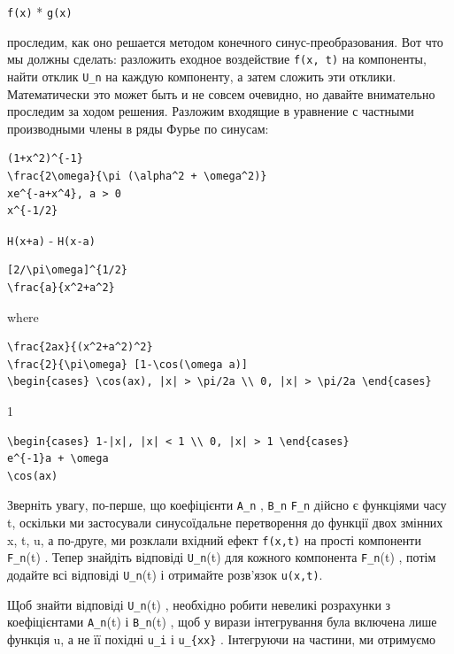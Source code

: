\documentclass[
  ukrainian,
]{article}
\begin{document}
\texttt{f(x)} * \texttt{g(x)}

проследим, как оно решается методом конечного синус-преобразования. Вот
что мы должны сделать: разложить еходное воздействие \texttt{f(x,\ t)}
на компоненты, найти отклик \texttt{U\_n} на каждую компоненту, а затем
сложить эти отклики. Математически это может быть и не совсем очевидно,
но давайте внимательно проследим за ходом решения. Разложим входящие в
уравнение с частными производными члены в ряды Фурье по синусам:

\begin{verbatim}
(1+x^2)^{-1}
\frac{2\omega}{\pi (\alpha^2 + \omega^2)}
xe^{-a+x^4}, a > 0
x^{-1/2}
\end{verbatim}

\texttt{H(x+a)} - \texttt{H(x-a)}

\begin{verbatim}
[2/\pi\omega]^{1/2}
\frac{a}{x^2+a^2}
\end{verbatim}

where

\begin{verbatim}
\frac{2ax}{(x^2+a^2)^2}
\frac{2}{\pi\omega} [1-\cos(\omega a)]
\begin{cases} \cos(ax), |x| > \pi/2a \\ 0, |x| > \pi/2a \end{cases}
\end{verbatim}

1

\begin{verbatim}
\begin{cases} 1-|x|, |x| < 1 \\ 0, |x| > 1 \end{cases}
e^{-1}a + \omega
\cos(ax)
\end{verbatim}

Зверніть увагу, по-перше, що коефіцієнти \texttt{A\_n} , \texttt{B\_n}
\texttt{F\_n} дійсно є функціями часу t, оскільки ми застосували
синусоїдальне перетворення до функції двох змінних x, t, u, а по-друге,
ми розклали вхідний ефект \texttt{f(x,t)} на прості компоненти
\texttt{F\_n}(t) . Тепер знайдіть відповіді \texttt{U\_n}(t) для кожного
компонента \texttt{F\_n}(t) , потім додайте всі відповіді
\texttt{U\_n}(t) і отримайте розв'язок \texttt{u(x,t)}.

Щоб знайти відповіді \texttt{U\_n}(t) , необхідно робити невеликі
розрахунки з коефіцієнтами \texttt{A\_n}(t) і \texttt{B\_n}(t) , щоб у
вирази інтегрування була включена лише функція u, а не її похідні
\texttt{u\_i} і \texttt{u\_\{xx\}} . Інтегруючи на частини, ми отримуємо
\end{document}
